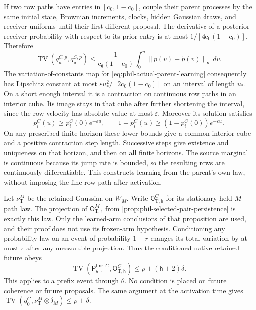 If two row paths have entries in \([\mathrm c_0,1-\mathrm c_0]\), couple their
parent processes by the same initial state, Brownian increments,
clocks, hidden Gaussian draws, and receiver uniforms until their
first different proposal. The derivative of a posterior receiver
probability with respect to its prior entry is at most
\(1/[4\mathrm c_0(1-\mathrm c_0)]\). Therefore
\[
 \operatorname{TV}(q_u^{C,p},q_u^{C,\widetilde p})
 \le\frac1{\mathrm c_0(1-\mathrm c_0)}
       \int_0^u\|p(v)-\widetilde p(v)\|_\infty dv.
\]
The variation-of-constants map for
\cref{eq:phil-actual-parent-learning} consequently has Lipschitz
constant at most \(\varepsilon u_*^2/[2\mathrm c_0(1-\mathrm c_0)]\) on an interval
of length \(u_*\). On a short enough interval it is a contraction
on continuous row paths in an interior cube. Its image stays in
that cube after further shortening the interval, since the row
velocity has absolute value at most \(\varepsilon\).
Moreover its solution satisfies
\[
 p_i^C(u)\ge p_i^C(0)e^{-\varepsilon u},\qquad
 1-p_i^C(u)\ge(1-p_i^C(0))e^{-\varepsilon u}.
\]
On any prescribed finite horizon these lower bounds give a common
interior cube and a positive contraction step length. Successive
steps give existence and uniqueness on that horizon, and then on
all finite horizons. The source marginal is continuous because its
jump rate is bounded, so the resulting rows are continuously
differentiable. This constructs learning from the parent's own law,
without imposing the fine row path after activation.

Let \(\overline\nu_{\mathrm T}^M\) be the retained Gaussian on
\(W_M\). Write \(\mathsf O^C_{\mathrm T,\mathsf h}\) for its
stationary held-\(M\) path law. The projection of
\(\mathsf O_{\mathrm T,\mathsf h}^M\) from
\cref{prop:phil-selected-pair-persistence} is exactly this law.
Only the learned-arm conclusions of that proposition are used, and
their proof does not use its frozen-arm hypothesis.
Conditioning any probability law on an event of probability
\(1-r\) changes its total variation by at most \(r\) after
any measurable projection. Thus the conditioned native retained
future obeys
\begin{equation}
 \operatorname{TV}
 (\mathsf P_{\theta,\mathsf h}^{\mathrm{fine},C},
                     \mathsf O^C_{\mathrm T,\mathsf h})
 \le\rho+(\mathsf h+2)\delta.
 \label{eq:phil-native-conditioned-held}
\end{equation}
This applies to a prefix event through \(\theta\). No condition is
placed on future coherence or future proposals. The same argument
at the activation time gives
\(\operatorname{TV}(q_0^C,
 \overline\nu_{\mathrm T}^M\otimes\delta_M)\le\rho+\delta\).

